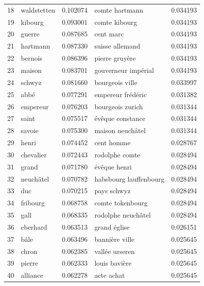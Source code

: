 \documentclass[11pt]{article}
\begin{document}
\begin{table}[H]
\begin{center}
\begin{small}
\begin{tabular*}{\textwidth}{|l|| @{\extracolsep{\fill}} l c || l c |}
18  &  waldstetten  &  0.102074  &          comte hartmann  &  0.034193  \\
19  &      kibourg  &  0.093001  &           comte kibourg  &  0.034193  \\
20  &       guerre  &  0.087685  &               cent marc  &  0.034193  \\
21  &     hartmann  &  0.087330  &         suisse allemand  &  0.034193  \\
22  &      bernois  &  0.086396  &          pierre gruyère  &  0.034193  \\
23  &       maison  &  0.083701  &     gouverneur impérial  &  0.034193  \\
24  &       schwyz  &  0.081660  &         bourgeois ville  &  0.033997  \\
25  &         abbé  &  0.077291  &       empereur frédéric  &  0.031382  \\
26  &     empereur  &  0.076203  &        bourgeois zurich  &  0.031344  \\
27  &        saint  &  0.075517  &        évêque constance  &  0.031344  \\
28  &       savoie  &  0.075300  &        maison neuchâtel  &  0.031344  \\
29  &        henri  &  0.074452  &              cent homme  &  0.028767  \\
30  &    chevalier  &  0.072443  &          rodolphe comte  &  0.028494  \\
31  &        grand  &  0.071780  &            évêque henri  &  0.028494  \\
32  &    neuchâtel  &  0.070782  &  habsbourg lauffenbourg  &  0.028494  \\
33  &          duc  &  0.070215  &             pays schwyz  &  0.028494  \\
34  &     fribourg  &  0.068758  &        comte tokenbourg  &  0.028494  \\
35  &         gall  &  0.068335  &      rodolphe neuchâtel  &  0.028494  \\
36  &     eberhard  &  0.063513  &            grand église  &  0.026151  \\
37  &         bâle  &  0.063496  &          bannière ville  &  0.025645  \\
38  &        chron  &  0.062385  &          vallée urseren  &  0.025645  \\
39  &       pierre  &  0.062333  &           louis bavière  &  0.025645  \\
40  &     alliance  &  0.062278  &              acte achat  &  0.025645  \\

\end{tabular*}
\end{small}
\end{center}
\end{table}
\end{document}
